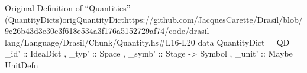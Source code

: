 \begin{haskell}{Original Definition of ``Quantities'' (QuantityDicts)}{origQuantityDict}{https://github.com/JacquesCarette/Drasil/blob/9c26b43d3e30c3f618e534a3f176a5152729af74/code/drasil-lang/Language/Drasil/Chunk/Quantity.hs\#L16-L20}
data QuantityDict = QD { _id' :: IdeaDict
                       , _typ' :: Space
                       , _symb' :: Stage -> Symbol
                       , _unit' :: Maybe UnitDefn
                       }
\end{haskell}

